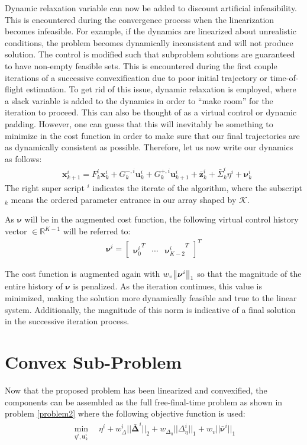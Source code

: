 \documentclass[conf]{new-aiaa}
\begin{document}
Dynamic relaxation variable can now be added to discount artificial infeasibility. This is encountered during the convergence process when the linearization becomes infeasible. For example, if the dynamics are linearized about unrealistic conditions, the problem becomes dynamically inconsistent and will not produce solution. The control is modified such that subproblem solutions are guaranteed to have non-empty feasible sets. This is encountered during the first couple iterations of a successive convexification due to poor initial trajectory or time-of-flight estimation. To get rid of this issue, dynamic relaxation is employed, where a slack variable is added to the dynamics in order to ``make room'' for the iteration to proceed. This can also be thought of as a virtual control or dynamic padding. However, one can guess that this will inevitably be something to minimize in the cost function in order to make sure that our final trajectories are as dynamically consistent as possible. Therefore, let us now write our dynamics as follows: 
%
\begin{align}
& \mathbf{x}_{k+1}^i = F_k^i\mathbf{x}_k^i + G^{-,i}_k\mathbf{u}_k^i + G_k^{+,i}\mathbf{u}_{k+1}^i + \bar{\mathbf{z}}^i_k +\bar{\Sigma}_k^i\eta^i + \bm{\nu}_k^i
\end{align}
The right super script $^i$ indicates the iterate of the algorithm, where the subscript $_k$ means the ordered parameter entrance in our array shaped by $\mathcal{K}$.

As $\bm{\nu}$ will be in the augmented cost function, the following virtual control history vector $\in \mathbb{R}^{K-1}$ will be referred to:
\begin{align}
\bm{\nu}^i = 
	\begin{bmatrix}
	{\bm{\nu}_0^i}^T & \cdots & {\bm{\nu}^i_{K-2}}^T 
	\end{bmatrix}^T
\end{align}

The cost function is augmented again with $w_v \norm{\bm{\nu}^i}_1$ so that the magnitude of the entire history of $\bm{\nu}$ is penalized. As the iteration continues, this value is minimized, making the solution more dynamically feasible and true to the linear system. Additionally, the magnitude of this norm is indicative of a final solution in the successive iteration process.

\section{Convex Sub-Problem}
Now that the proposed problem has been linearized and convexified, the components can be assembled as the full free-final-time problem as shown in problem \ref{problem2} where the following objective function is used:
\begin{align}
	\min_{\eta^i, \mathbf{u}_k^i} \quad \eta^i + w_\Delta^i || \bm{\bar{\Delta}}^i ||_2 + w_{\Delta_\eta} || \Delta_\eta^i ||_1 + w_v || \bar{\bm{\nu}}^i ||_1
\end{align}
\end{document}

